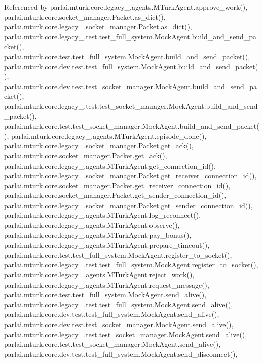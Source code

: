 Referenced by parlai.\+mturk.\+core.\+legacy\+\_.\+agents.\+M\+Turk\+Agent.\+approve\+\_\+work(), parlai.\+mturk.\+core.\+socket\+\_\+manager.\+Packet.\+as\+\_\+dict(), parlai.\+mturk.\+core.\+legacy\+\_.\+socket\+\_\+manager.\+Packet.\+as\+\_\+dict(), parlai.\+mturk.\+core.\+legacy\+\_.\+test.\+test\+\_\+full\+\_\+system.\+Mock\+Agent.\+build\+\_\+and\+\_\+send\+\_\+packet(), parlai.\+mturk.\+core.\+test.\+test\+\_\+full\+\_\+system.\+Mock\+Agent.\+build\+\_\+and\+\_\+send\+\_\+packet(), parlai.\+mturk.\+core.\+dev.\+test.\+test\+\_\+full\+\_\+system.\+Mock\+Agent.\+build\+\_\+and\+\_\+send\+\_\+packet(), parlai.\+mturk.\+core.\+dev.\+test.\+test\+\_\+socket\+\_\+manager.\+Mock\+Agent.\+build\+\_\+and\+\_\+send\+\_\+packet(), parlai.\+mturk.\+core.\+legacy\+\_.\+test.\+test\+\_\+socket\+\_\+manager.\+Mock\+Agent.\+build\+\_\+and\+\_\+send\+\_\+packet(), parlai.\+mturk.\+core.\+test.\+test\+\_\+socket\+\_\+manager.\+Mock\+Agent.\+build\+\_\+and\+\_\+send\+\_\+packet(), parlai.\+mturk.\+core.\+legacy\+\_.\+agents.\+M\+Turk\+Agent.\+episode\+\_\+done(), parlai.\+mturk.\+core.\+legacy\+\_.\+socket\+\_\+manager.\+Packet.\+get\+\_\+ack(), parlai.\+mturk.\+core.\+socket\+\_\+manager.\+Packet.\+get\+\_\+ack(), parlai.\+mturk.\+core.\+legacy\+\_.\+agents.\+M\+Turk\+Agent.\+get\+\_\+connection\+\_\+id(), parlai.\+mturk.\+core.\+legacy\+\_.\+socket\+\_\+manager.\+Packet.\+get\+\_\+receiver\+\_\+connection\+\_\+id(), parlai.\+mturk.\+core.\+socket\+\_\+manager.\+Packet.\+get\+\_\+receiver\+\_\+connection\+\_\+id(), parlai.\+mturk.\+core.\+socket\+\_\+manager.\+Packet.\+get\+\_\+sender\+\_\+connection\+\_\+id(), parlai.\+mturk.\+core.\+legacy\+\_.\+socket\+\_\+manager.\+Packet.\+get\+\_\+sender\+\_\+connection\+\_\+id(), parlai.\+mturk.\+core.\+legacy\+\_.\+agents.\+M\+Turk\+Agent.\+log\+\_\+reconnect(), parlai.\+mturk.\+core.\+legacy\+\_.\+agents.\+M\+Turk\+Agent.\+observe(), parlai.\+mturk.\+core.\+legacy\+\_.\+agents.\+M\+Turk\+Agent.\+pay\+\_\+bonus(), parlai.\+mturk.\+core.\+legacy\+\_.\+agents.\+M\+Turk\+Agent.\+prepare\+\_\+timeout(), parlai.\+mturk.\+core.\+test.\+test\+\_\+full\+\_\+system.\+Mock\+Agent.\+register\+\_\+to\+\_\+socket(), parlai.\+mturk.\+core.\+legacy\+\_.\+test.\+test\+\_\+full\+\_\+system.\+Mock\+Agent.\+register\+\_\+to\+\_\+socket(), parlai.\+mturk.\+core.\+legacy\+\_.\+agents.\+M\+Turk\+Agent.\+reject\+\_\+work(), parlai.\+mturk.\+core.\+legacy\+\_.\+agents.\+M\+Turk\+Agent.\+request\+\_\+message(), parlai.\+mturk.\+core.\+test.\+test\+\_\+full\+\_\+system.\+Mock\+Agent.\+send\+\_\+alive(), parlai.\+mturk.\+core.\+legacy\+\_.\+test.\+test\+\_\+full\+\_\+system.\+Mock\+Agent.\+send\+\_\+alive(), parlai.\+mturk.\+core.\+dev.\+test.\+test\+\_\+full\+\_\+system.\+Mock\+Agent.\+send\+\_\+alive(), parlai.\+mturk.\+core.\+dev.\+test.\+test\+\_\+socket\+\_\+manager.\+Mock\+Agent.\+send\+\_\+alive(), parlai.\+mturk.\+core.\+legacy\+\_.\+test.\+test\+\_\+socket\+\_\+manager.\+Mock\+Agent.\+send\+\_\+alive(), parlai.\+mturk.\+core.\+test.\+test\+\_\+socket\+\_\+manager.\+Mock\+Agent.\+send\+\_\+alive(), parlai.\+mturk.\+core.\+dev.\+test.\+test\+\_\+full\+\_\+system.\+Mock\+Agent.\+send\+\_\+disconnect(), 